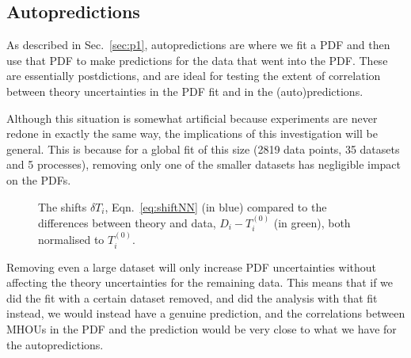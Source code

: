 \subsection{Autopredictions}
As described in Sec.~\ref{sec:p1}, autopredictions are where we fit a PDF and then use that PDF to make predictions for the data that went into the PDF. These are essentially postdictions, and are ideal for testing the extent of correlation between theory uncertainties in the PDF fit and in the (auto)predictions. 

Although this situation is somewhat artificial because experiments are never redone in exactly the same way, the implications of this investigation will be general. This is because for a global fit of this size (2819 data points, 35 datasets and 5 processes), removing only one of the smaller datasets has negligible impact on the PDFs. 
\begin{figure}[H]
    \begin{center}
    \end{center}
  \vspace{-0.55cm}
  \caption{The shifts $\delta T_i$, Eqn.~\ref{eq:shiftNN} (in blue) compared to the differences between theory and data, $D_i-T^{(0)}_i$ (in green), both normalised to $T^{(0)}_i$.} 
  \label{fig:shifts}
\end{figure}
Removing even a large dataset will only increase PDF uncertainties without affecting the theory uncertainties for the remaining data. This means that if we did the fit with a certain dataset removed, and did the analysis with that fit instead, we would instead have a genuine prediction, and the correlations between MHOUs in the PDF and the prediction would be very close to what we have for the autopredictions.

